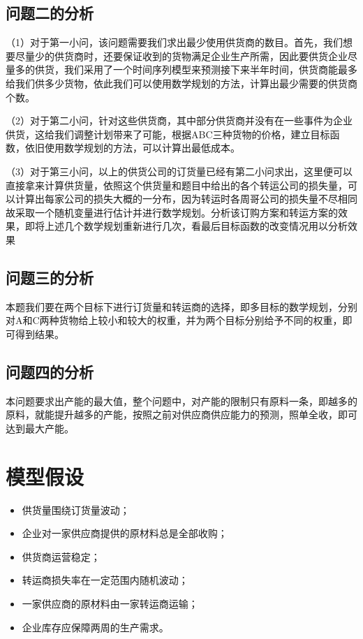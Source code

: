\documentclass[withoutpreface,bwprint]{cumcmthesis} %
\begin{document}
\subsection{问题二的分析}
（1）对于第一小问，该问题需要我们求出最少使用供货商的数目。首先，我们想要尽量少的供货商时，还要保证收到的货物满足企业生产所需，因此要供货企业尽量多的供货，我们采用了一个时间序列模型来预测接下来半年时间，供货商能最多给我们供多少货物，依此我们可以使用数学规划的方法，计算出最少需要的供货商个数。

（2）对于第二小问，针对这些供货商，其中部分供货商并没有在一些事件为企业供货，这给我们调整计划带来了可能，根据ABC三种货物的价格，建立目标函数，依旧使用数学规划的方法，可以计算出最低成本。

（3）对于第三小问，以上的供货公司的订货量已经有第二小问求出，这里便可以直接拿来计算供货量，依照这个供货量和题目中给出的各个转运公司的损失量，可以计算出每家公司的损失大概的一分布，因为转运时各周哥公司的损失量不尽相同故采取一个随机变量进行估计并进行数学规划。分析该订购方案和转运方案的效果，即将上述几个数学规划重新进行几次，看最后目标函数的改变情况用以分析效果
\subsection{问题三的分析}
本题我们要在两个目标下进行订货量和转运商的选择，即多目标的数学规划，分别对A和C两种货物给上较小和较大的权重，并为两个目标分别给予不同的权重，即可得到结果。
\subsection{问题四的分析}
本问题要求出产能的最大值，整个问题中，对产能的限制只有原料一条，即越多的原料，就能提升越多的产能，按照之前对供应商供应能力的预测，照单全收，即可达到最大产能。
\section{模型假设}

\begin{itemize}
\item 供货量围绕订货量波动；
\item 企业对一家供应商提供的原材料总是全部收购；
\item 供货商运营稳定；
\item 转运商损失率在一定范围内随机波动；
\item 一家供应商的原材料由一家转运商运输；
\item 企业库存应保障两周的生产需求。
\end{itemize}
\end{document}
